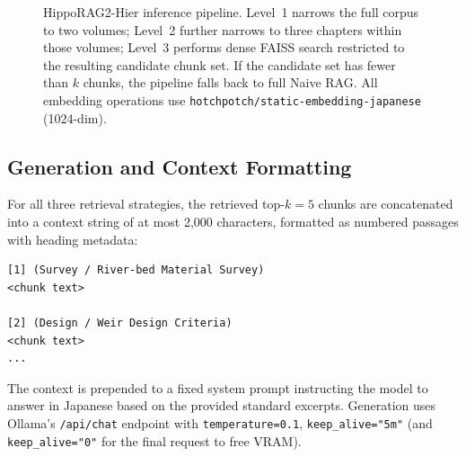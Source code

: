 \documentclass[twocolumn]{article}
\begin{document}
\begin{figure}[t]
  \caption{HippoRAG2-Hier inference pipeline.
    Level~1 narrows the full corpus to two volumes;
    Level~2 further narrows to three chapters within those volumes;
    Level~3 performs dense FAISS search restricted to the resulting candidate chunk set.
    If the candidate set has fewer than $k$ chunks, the pipeline falls back to full Naive RAG.
    All embedding operations use \texttt{hotchpotch/static-embedding-japanese} (1024-dim).}
  \label{fig:hippo2_flow}
\end{figure}

\subsection{Generation and Context Formatting}

For all three retrieval strategies, the retrieved top-$k=5$ chunks are
concatenated into a context string of at most 2,000 characters,
formatted as numbered passages with heading metadata:
\begin{verbatim}
[1] (Survey / River-bed Material Survey)
<chunk text>

[2] (Design / Weir Design Criteria)
<chunk text>
...
\end{verbatim}
The context is prepended to a fixed system prompt instructing the model to answer
in Japanese based on the provided standard excerpts.
Generation uses Ollama's \texttt{/api/chat} endpoint with
\texttt{temperature=0.1}, \texttt{keep\_alive="5m"}
(and \texttt{keep\_alive="0"} for the final request to free VRAM).
\end{document}
